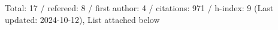 Total: 17 / refereed: 8 / first author: 4 / citations: 971 / h-index: 9 (Last updated: 2024-10-12), List attached below
